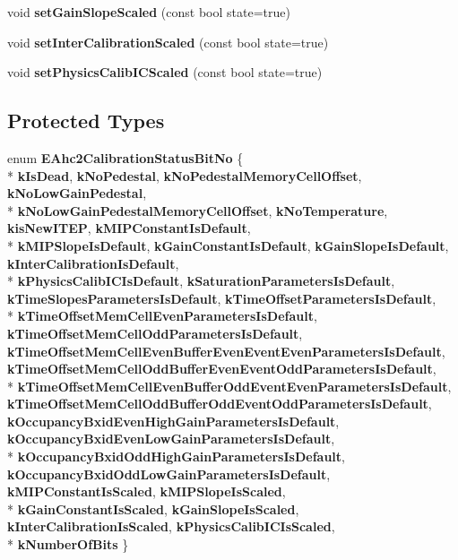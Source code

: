 \begin{DoxyCompactItemize}
\item 
void {\bfseries set\-Gain\-Slope\-Scaled} (const bool state=true)\label{classCALICE_1_1Ahc2CalibrationStatusBits_a7c8db965152f0f13fb2d0b2278136288}

\item 
void {\bfseries set\-Inter\-Calibration\-Scaled} (const bool state=true)\label{classCALICE_1_1Ahc2CalibrationStatusBits_ad918faf4d0f89479592661f385559ec6}

\item 
void {\bfseries set\-Physics\-Calib\-I\-C\-Scaled} (const bool state=true)\label{classCALICE_1_1Ahc2CalibrationStatusBits_a214becc89abb9ebfaa913884f848d59c}

\end{DoxyCompactItemize}
\subsection*{Protected Types}
\begin{DoxyCompactItemize}
\item 
enum {\bf E\-Ahc2\-Calibration\-Status\-Bit\-No} \{ \\*
{\bf k\-Is\-Dead}, 
{\bf k\-No\-Pedestal}, 
{\bf k\-No\-Pedestal\-Memory\-Cell\-Offset}, 
{\bf k\-No\-Low\-Gain\-Pedestal}, 
\\*
{\bf k\-No\-Low\-Gain\-Pedestal\-Memory\-Cell\-Offset}, 
{\bf k\-No\-Temperature}, 
{\bf kis\-New\-I\-T\-E\-P}, 
{\bf k\-M\-I\-P\-Constant\-Is\-Default}, 
\\*
{\bf k\-M\-I\-P\-Slope\-Is\-Default}, 
{\bf k\-Gain\-Constant\-Is\-Default}, 
{\bf k\-Gain\-Slope\-Is\-Default}, 
{\bf k\-Inter\-Calibration\-Is\-Default}, 
\\*
{\bf k\-Physics\-Calib\-I\-C\-Is\-Default}, 
{\bf k\-Saturation\-Parameters\-Is\-Default}, 
{\bf k\-Time\-Slopes\-Parameters\-Is\-Default}, 
{\bf k\-Time\-Offset\-Parameters\-Is\-Default}, 
\\*
{\bf k\-Time\-Offset\-Mem\-Cell\-Even\-Parameters\-Is\-Default}, 
{\bf k\-Time\-Offset\-Mem\-Cell\-Odd\-Parameters\-Is\-Default}, 
{\bfseries k\-Time\-Offset\-Mem\-Cell\-Even\-Buffer\-Even\-Event\-Even\-Parameters\-Is\-Default}, 
{\bfseries k\-Time\-Offset\-Mem\-Cell\-Odd\-Buffer\-Even\-Event\-Odd\-Parameters\-Is\-Default}, 
\\*
{\bfseries k\-Time\-Offset\-Mem\-Cell\-Even\-Buffer\-Odd\-Event\-Even\-Parameters\-Is\-Default}, 
{\bfseries k\-Time\-Offset\-Mem\-Cell\-Odd\-Buffer\-Odd\-Event\-Odd\-Parameters\-Is\-Default}, 
{\bfseries k\-Occupancy\-Bxid\-Even\-High\-Gain\-Parameters\-Is\-Default}, 
{\bfseries k\-Occupancy\-Bxid\-Even\-Low\-Gain\-Parameters\-Is\-Default}, 
\\*
{\bfseries k\-Occupancy\-Bxid\-Odd\-High\-Gain\-Parameters\-Is\-Default}, 
{\bfseries k\-Occupancy\-Bxid\-Odd\-Low\-Gain\-Parameters\-Is\-Default}, 
{\bf k\-M\-I\-P\-Constant\-Is\-Scaled}, 
{\bf k\-M\-I\-P\-Slope\-Is\-Scaled}, 
\\*
{\bf k\-Gain\-Constant\-Is\-Scaled}, 
{\bf k\-Gain\-Slope\-Is\-Scaled}, 
{\bf k\-Inter\-Calibration\-Is\-Scaled}, 
{\bf k\-Physics\-Calib\-I\-C\-Is\-Scaled}, 
\\*
{\bfseries k\-Number\-Of\-Bits}
 \}
\end{DoxyCompactItemize}

